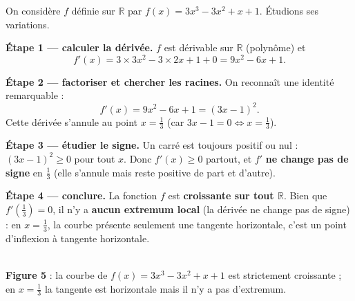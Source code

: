 \documentclass[11pt,a4paper]{article}
\newcommand{\R}{\mathbb{R}}
\begin{document}
\begin{exemple}[$f(x)=3x^3-3x^2+x+1$ — fonction toujours croissante]
On considère $f$ définie sur $\R$ par $f(x)=3x^3-3x^2+x+1$. Étudions ses variations.

\medskip
\textbf{Étape 1 — calculer la dérivée.} $f$ est dérivable sur $\R$ (polynôme) et
\[
   f'(x)=3\times 3x^2-3\times 2x+1+0=9x^2-6x+1.
\]

\textbf{Étape 2 — factoriser et chercher les racines.} On reconnaît une identité remarquable :
\[
   f'(x)=9x^2-6x+1=(3x-1)^2.
\]
Cette dérivée s'annule au point $x=\tfrac13$ (car $3x-1=0\Leftrightarrow x=\tfrac13$).

\textbf{Étape 3 — étudier le signe.} Un carré est toujours positif ou nul : $(3x-1)^2\geq 0$ pour
tout $x$. Donc $f'(x)\geq 0$ partout, et $f'$ \textbf{ne change pas de signe} en $\tfrac13$
(elle s'annule mais reste positive de part et d'autre).

\textbf{Étape 4 — conclure.} La fonction $f$ est \textbf{croissante sur tout $\R$}. Bien que
$f'(\tfrac13)=0$, il n'y a \textbf{aucun extremum local} (la dérivée ne change pas de signe) :
en $x=\tfrac13$, la courbe présente seulement une tangente horizontale, c'est un point d'inflexion à
tangente horizontale.
\end{exemple}

\begin{center}
\\[2pt]
{\small\textbf{\textcolor{primary}{Figure 5}} : la courbe de $f(x)=3x^3-3x^2+x+1$ est strictement
croissante ; en $x=\tfrac13$ la tangente est horizontale mais il n'y a pas d'extremum.}
\end{center}
\end{document}
